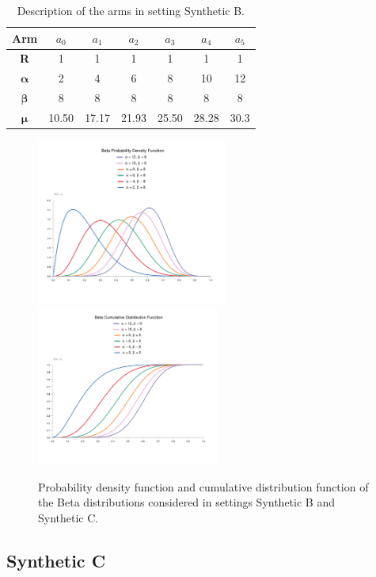 \begin{table}[H]
	\centering
	\caption{Description of the arms in setting Synthetic B.}
	
	\begin{tabular}{|c|cccccc|}
		\hline
		\textbf{Arm}          & $a_0$ & $a_1$ & $a_2$ & $a_3$ & $a_4$ & $a_5$ \\ \hline
		\textbf{R}            & 1     & 1     & 1     & 1     & 1     & 1     \\
		$\boldsymbol{\alpha}$ & 2     & 4     & 6     & 8     & 10    & 12    \\
		$\boldsymbol{\beta}$  & 8     & 8     & 8     & 8     & 8     & 8     \\
		$\boldsymbol{\mu}$    & 10.50 & 17.17 & 21.93 & 25.50 & 28.28 & 30.3  \\ \hline
	\end{tabular}

\label{tabSB}
\end{table}
\begin{figure}[H]
	\centering
	\includegraphics[width=6.26cm]{./images/chart (1)-1.png}\quad\includegraphics[width=6cm]{./images/chart (2)-1.png}
	\caption{Probability density function and cumulative distribution function of the Beta distributions considered in settings Synthetic B and Synthetic C.}
	\label{beta}
\end{figure}

\subsection{Synthetic C}\label{SC}

